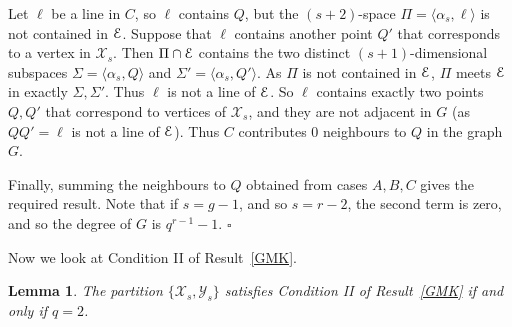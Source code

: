 \documentclass[12pt]{article}
\newtheorem{lemma}[theorem]{Lemma}
\newenvironment{proof}{\noindent{\bf Proof}\hspace{0.5em}}
    { \null  \hfill $\square$ \par}
\newcommand{\X}{\mathcal X}
\newcommand{\Y}{\mathcal Y}
\newcommand\E{{\cal E}}
\newcommand{\Label}{\label}
\begin{document}
\begin{proof}
Let $\ell$ be a line in $C$, so $\ell$ contains $Q$, but the $(s+2)$-space $\Pi=\langle \alpha_s,\ell\rangle$ is not contained in $\E$. Suppose that $\ell$ contains another point $Q'$ that corresponds to a vertex  in $\X_s$. Then $\Pi\cap\E$ contains the two distinct $(s+1)$-dimensional subspaces 
$\Sigma=\langle \alpha_s,Q\rangle$  and $\Sigma'=\langle \alpha_s,Q'\rangle$. As $\Pi$ is not contained in $\E$, $\Pi$ meets $\E$ in exactly $\Sigma,\Sigma'$. Thus $\ell$ is not a line of $\E$. So $\ell$ contains exactly two points $Q,Q'$ that correspond to vertices of $\X_s$, and they are not adjacent in $G$ (as $QQ'=\ell$ is not a line of $\E$). Thus $C$ contributes 0  neighbours to $Q$ in the graph $G$. 



Finally, summing the neighbours to $Q$ obtained from cases $A,B,C$ gives the required result. Note that if $s=g-1$, and so $s=r-2$, the second term is zero, and so the degree of $G$ is $q^{r-1}-1$.
\end{proof}

Now we look at Condition II of Result~\ref{GMK}. 

\begin{lemma}\Label{lemma-ell-3} 
The partition  $\{\X_s,\Y_s\}$ satisfies Condition II of Result~\ref{GMK} if and only if $q=2$.
\end{lemma}
\end{document}
